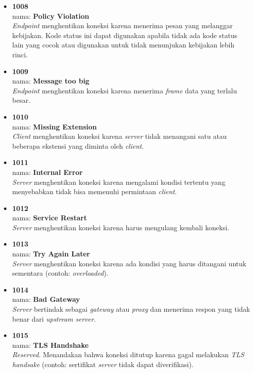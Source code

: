 \begin{itemize}
	\item \textbf{1008} \\ nama: \textbf{Policy Violation} \\ \textit{Endpoint} menghentikan koneksi karena menerima pesan yang melanggar kebijakan. Kode status ini dapat digunakan apabila tidak ada kode status lain yang cocok atau digunakan untuk tidak menunjukan kebijakan lebih rinci.
	
	\item \textbf{1009} \\ nama: \textbf{Message too big} \\ \textit{Endpoint} menghentikan koneksi karena menerima \textit{frame} data yang terlalu besar.
	
	\item \textbf{1010} \\ nama: \textbf{Missing Extension} \\ \textit{Client} menghentikan koneksi karena \textit{server} tidak menangani satu atau beberapa ekstensi yang diminta oleh \textit{client}.
	
	\item \textbf{1011} \\ nama: \textbf{Internal Error} \\ \textit{Server} menghentikan koneksi karena mengalami kondisi tertentu yang menyebabkan tidak bisa memenuhi permintaan \textit{client}.
	
	\item \textbf{1012} \\ nama: \textbf{Service Restart} \\ \textit{Server} menghentikan koneksi karena harus mengulang kembali koneksi.
	
	\item \textbf{1013} \\ nama: \textbf{Try Again Later} \\ \textit{Server} menghentikan koneksi karena ada kondisi yang harus ditangani untuk sementara (contoh: \textit{overloaded}).
	
	\item \textbf{1014} \\ nama: \textbf{Bad Gateway} \\ \textit{Server} bertindak sebagai \textit{gateway} atau \textit{proxy} dan menerima respon yang tidak benar dari \textit{upstream server}.
	
	\item \textbf{1015} \\ nama: \textbf{TLS Handshake} \\ \textit{Reserved}. Menandakan bahwa koneksi ditutup karena gagal melakukan \textit{TLS handsake} (contoh: sertifikat \textit{server} tidak dapat diverifikasi).
	

\end{itemize}
